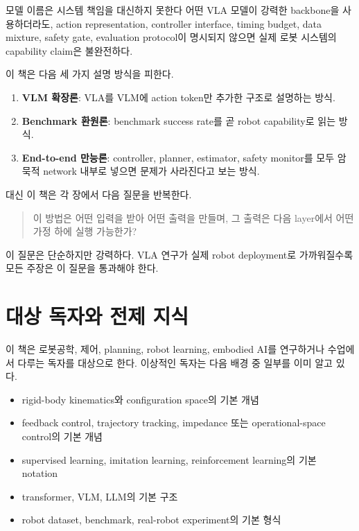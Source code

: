 \begin{warningbox}{모델 이름은 시스템 책임을 대신하지 못한다}
어떤 VLA 모델이 강력한 backbone을 사용하더라도, action representation, controller interface, timing budget, data mixture, safety gate, evaluation protocol이 명시되지 않으면 실제 로봇 시스템의 capability claim은 불완전하다.
\end{warningbox}

이 책은 다음 세 가지 설명 방식을 피한다.

\begin{enumerate}
  \item \textbf{VLM 확장론}: VLA를 VLM에 action token만 추가한 구조로 설명하는 방식.
  \item \textbf{Benchmark 환원론}: benchmark success rate를 곧 robot capability로 읽는 방식.
  \item \textbf{End-to-end 만능론}: controller, planner, estimator, safety monitor를 모두 암묵적 network 내부로 넣으면 문제가 사라진다고 보는 방식.
\end{enumerate}

대신 이 책은 각 장에서 다음 질문을 반복한다.

\begin{quote}
이 방법은 어떤 입력을 받아 어떤 출력을 만들며, 그 출력은 다음 layer에서 어떤 가정 하에 실행 가능한가?
\end{quote}

이 질문은 단순하지만 강력하다. VLA 연구가 실제 robot deployment로 가까워질수록 모든 주장은 이 질문을 통과해야 한다.

\section{대상 독자와 전제 지식}

이 책은 로봇공학, 제어, planning, robot learning, embodied AI를 연구하거나 수업에서 다루는 독자를 대상으로 한다. 이상적인 독자는 다음 배경 중 일부를 이미 알고 있다.

\begin{itemize}
  \item rigid-body kinematics와 configuration space의 기본 개념
  \item feedback control, trajectory tracking, impedance 또는 operational-space control의 기본 개념
  \item supervised learning, imitation learning, reinforcement learning의 기본 notation
  \item transformer, VLM, LLM의 기본 구조
  \item robot dataset, benchmark, real-robot experiment의 기본 형식
\end{itemize}

